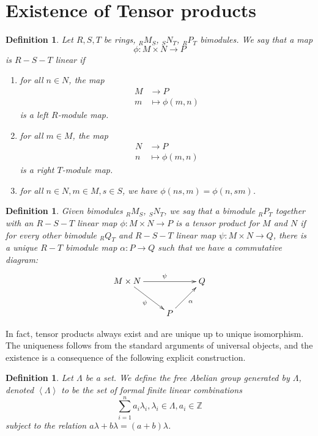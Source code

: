 \documentclass[12pt]{report}
\theoremstyle{plain}
\newtheorem{defn}[thm]{Definition}
\newcommand{\ZZ}{\mathbb{Z}}
\begin{document}
\section{Existence of Tensor products}

\begin{defn}
Let $R, S, T$ be rings, $_R M_S$, $_S N_T$, $_R P _T$ bimodules. We say
that a map
\[\phi : M \times N \to P\]
is $R-S-T$ linear if
\begin{enumerate}[1. ]
\item for all $n \in N$, the map
\begin{align*}
M &\to P \\
m &\mapsto \phi(m, n)
\end{align*}
is a left $R$-module map.
\item for all $m \in M$, the map
\begin{align*}
N &\to P \\
n &\mapsto \phi(m, n)
\end{align*}
is a right $T$-module map.
\item for all $n \in N, m \in M, s \in S$, we have $\phi(ns, m) = \phi(n,
sm)$.
\end{enumerate}
\end{defn}

\begin{defn}
Given bimodules $ _R M_S$, $_S N_T$, we say that a bimodule $ _R P_T$
together with an $R-S-T$ linear map $\phi: M \times N \to P$ is a tensor product
for $M$ and $N$ if for every other bimodule $_R Q_T$ and $R-S-T$ linear map
$\psi : M \times N \to Q$, there is a unique $R-T$ bimodule map $\alpha : P
\to Q$ such that we have a commutative diagram:
\[\xymatrix{
M \times N \ar[rd]_{\psi} \ar[rr]^\psi & & Q \\
 & P \ar[ru]_{\alpha}
}\]
\end{defn}

In fact, tensor products always exist and are unique up to unique
isomorphism. The uniqueness follows from the standard arguments of
universal objects, and the existence is a consequence of the following
explicit construction.

\begin{defn}
Let $\Lambda$ be a set. We define the free Abelian group
generated by $\Lambda$, denoted $\left<\Lambda\right>$ to be the set
of formal finite linear combinations
\[\sum_{i = 1}^n a_i \lambda_i , \lambda_i \in
\Lambda, a_i \in \ZZ \]
subject to the relation $a \lambda + b \lambda = (a + b) \lambda$.
\end{defn}
\end{document}
